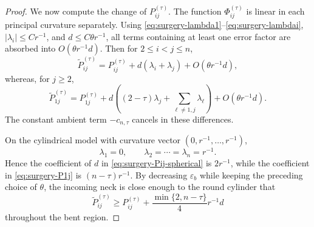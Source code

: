 \documentclass[11pt,reqno]{amsart}
\theoremstyle{definition}
\theoremstyle{remark}
\numberwithin{equation}{section}
\newcommand{\eps}{\varepsilon}
\begin{document}
\begin{proof}
We now compute the change of $P_{ij}^{(\tau)}$.  The function
$\Phi_{ij}^{(\tau)}$ is linear in each principal curvature separately.
Using \eqref{eq:surgery-lambda1}--\eqref{eq:surgery-lambdai},
$|\lambda_i|\leq Cr^{-1}$, and
$d\leq C\theta r^{-1}$, all terms containing at least one error factor
are absorbed into $O(\theta r^{-1}d)$. Then for
  $2\leq i<j\leq n$,
  \begin{equation}\label{eq:surgery-Pij-spherical}
    \widetilde P_{ij}^{(\tau)}
    =
    P_{ij}^{(\tau)}
    +d(\lambda_i+\lambda_j)
    +O(\theta r^{-1}d),
  \end{equation}
  whereas, for $j\geq2$,
  \begin{equation}\label{eq:surgery-P1j}
    \widetilde P_{1j}^{(\tau)}
    =
    P_{1j}^{(\tau)}
    +d\left(
    (2-\tau)\lambda_j
    +\sum_{\ell\ne1,j}\lambda_\ell
    \right)
    +O(\theta r^{-1}d).
  \end{equation}
  The constant ambient term $-c_{n,\tau}$ cancels in these differences.

  On the cylindrical model with curvature vector
  $(0,r^{-1},\ldots,r^{-1})$,
  \begin{equation*}
  \lambda_1=0,
  \qquad
  \lambda_2=\cdots=\lambda_n=r^{-1}.
  \end{equation*}
  Hence the coefficient of $d$ in
  \eqref{eq:surgery-Pij-spherical} is $2r^{-1}$, while the coefficient in
  \eqref{eq:surgery-P1j} is $(n-\tau)r^{-1}$.
  By decreasing $\eps_b$ while keeping the preceding choice of $\theta$, the
  incoming neck is close enough to the round cylinder that
  \begin{equation}\label{eq:surgery-P-gain}
    \widetilde P_{ij}^{(\tau)}
    \geq
    P_{ij}^{(\tau)}
    +\frac{\min\{2,n-\tau\}}4r^{-1}d
  \end{equation}
  throughout the bent region.


\end{proof}
\end{document}
